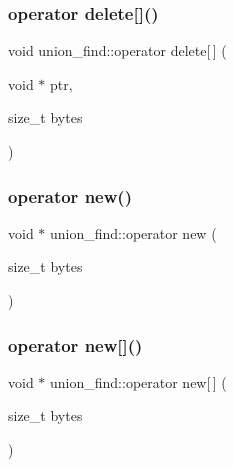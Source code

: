 \mbox{\label{classunion__find_a619b48026730994f7db0485a7109a528}} 
\subsubsection{\texorpdfstring{operator delete[]()}{operator delete[]()}}
{\footnotesize\ttfamily void union\+\_\+find\+::operator delete\mbox{[}$\,$\mbox{]} (\begin{DoxyParamCaption}\item[{void $\ast$}]{ptr,  }\item[{size\+\_\+t}]{bytes }\end{DoxyParamCaption})}

\mbox{\label{classunion__find_ad7038446fd354936d5c5c8377a3a9627}} 
\subsubsection{\texorpdfstring{operator new()}{operator new()}}
{\footnotesize\ttfamily void $\ast$ union\+\_\+find\+::operator new (\begin{DoxyParamCaption}\item[{size\+\_\+t}]{bytes }\end{DoxyParamCaption})}

\mbox{\label{classunion__find_a3f08bf34a0bcc0aabc97b9b478cff6bc}} 
\subsubsection{\texorpdfstring{operator new[]()}{operator new[]()}}
{\footnotesize\ttfamily void $\ast$ union\+\_\+find\+::operator new\mbox{[}$\,$\mbox{]} (\begin{DoxyParamCaption}\item[{size\+\_\+t}]{bytes }\end{DoxyParamCaption})}

